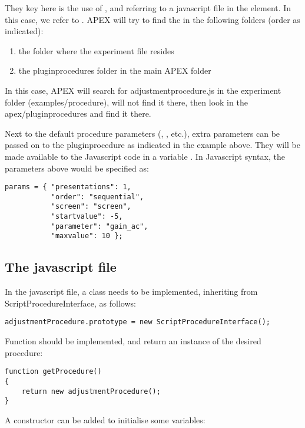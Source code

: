 They key here is the use of , and referring to a javascript file in the  element. In this case, we refer to . APEX will try to find the in the following folders (order as indicated):
\begin{enumerate}
\item the folder where the experiment file resides
\item the pluginprocedures folder in the main APEX folder
\end{enumerate}

In this case, APEX will search for adjustmentprocedure.js in the experiment folder (examples/procedure), will not find it there, then look in the apex/pluginprocedures and find it there.

Next to the default procedure parameters (, , etc.), extra parameters can be passed on to the pluginprocedure as indicated in the example above. They will be made available to the Javascript code in a variable . In Javascript syntax, the parameters above would be specified as:

\begin{lstlisting}
params = { "presentations": 1,
		   "order": "sequential",
		   "screen": "screen",
		   "startvalue": -5,
		   "parameter": "gain_ac",
		   "maxvalue": 10 };
\end{lstlisting}



\subsection{The javascript file}

In the javascript file, a class needs to be implemented, inheriting from ScriptProcedureInterface, as follows:

\begin{lstlisting}
adjustmentProcedure.prototype = new ScriptProcedureInterface();
\end{lstlisting}

Function  should be implemented, and return an instance of the desired procedure:

\begin{lstlisting}
function getProcedure()
{
    return new adjustmentProcedure();
}
\end{lstlisting}

A constructor can be added to initialise some variables:

